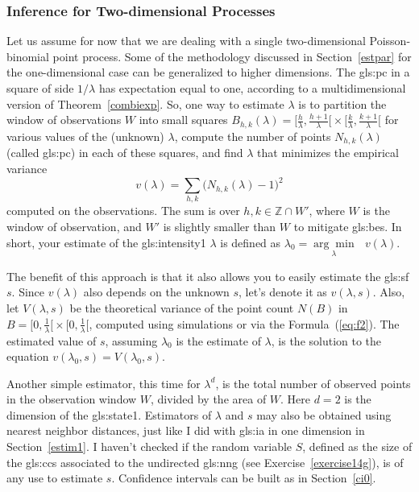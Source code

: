 \documentclass[10pt]{article}
\begin{document}
\subsubsection{Inference for Two-dimensional Processes}\label{spa1}

Let us assume for now that we are dealing with a single two-dimensional Poisson-binomial point process. Some of the methodology  discussed in Section~\ref{estpar} for the one-dimensional case can be generalized to higher dimensions. The 
\gls{gls:pc} in a square of side
$1/\lambda$ has expectation equal to one, according to a multidimensional version of Theorem~\ref{combiexp}. So, one way to estimate $\lambda$ is to partition the window of observations $W$ into small squares $B_{h,k}(\lambda)=\Big[\frac{h}{\lambda}, \frac{h+1}{\lambda}\Big[ \times 
\Big[\frac{k}{\lambda}, \frac{k+1}{\lambda}\Big[$ for various values of the (unknown) $\lambda$,
compute the number of points $N_{h,k}(\lambda)$ (called \gls{gls:pc}) in each of these squares, and find $\lambda$ that minimizes the empirical variance
$$v(\lambda)=\sum_{h,k}\Big(N_{h,k}(\lambda)-1\Big)^2$$
computed on the observations. The sum is over $h,k\in \mathbb{Z}\cap W'$, where $W$ is the window of observation, 
and $W'$ is slightly smaller than $W$ to mitigate
\glspl{gls:be}. In short, your estimate of the \gls{gls:intensity1} $\lambda$ is defined as $\lambda_0=\underset{\lambda}{\arg\min} \mbox{ } v(\lambda)$.

The benefit of this approach is that it also allows you to easily estimate the \gls{gls:sf} $s$. Since $v(\lambda)$ also depends on the unknown $s$, let's denote it as 
$v(\lambda,s)$. Also, let $V(\lambda,s)$ be the theoretical variance of the point count $N(B)$ in $B=\Big[0,\frac{1}{\lambda}\Big[ \times \Big[0,\frac{1}{\lambda}\Big[$, computed using simulations or via the Formula~(\ref{eq:f2}). The 
estimated value of $s$, assuming $\lambda_0$ is the estimate of $\lambda$, is the solution to the equation $v(\lambda_0,s)=V(\lambda_0,s)$. 

Another simple estimator, this time for $\lambda^d$, is the total number of observed points in the observation window $W$, divided by the area of $W$. Here $d=2$ is the dimension of the 
\gls{gls:state1}. Estimators of $\lambda$ and $s$ may also be obtained using \textcolor{index}{nearest neighbor} distances, just like I did with
\gls{gls:ia} in one dimension in Section~\ref{estim1}. I haven't checked if the random variable $S$, defined as the size of the 
\glspl{gls:cc} associated to the 
 \textcolor{index}{undirected} \gls{gls:nng} 
(see Exercise~\ref{exercise14g}), is of any use to estimate $s$. 
\textcolor{index}{Confidence intervals} can be built as in Section~\ref{ci0}. \\
\end{document}
